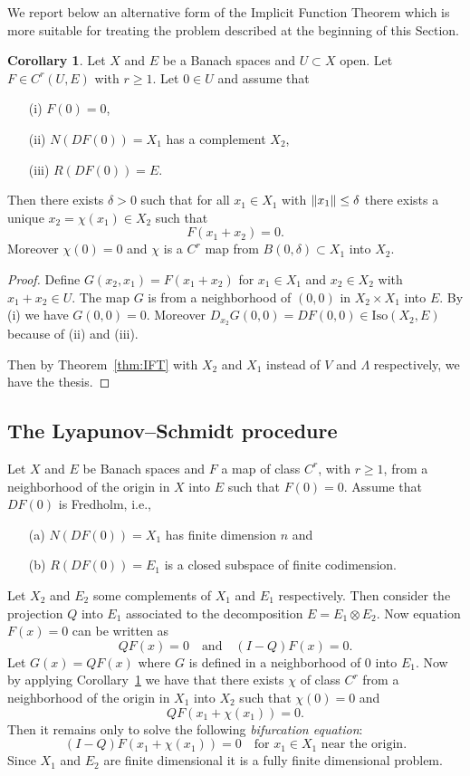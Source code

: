 \documentclass[a4paper,11pt]{article}
\theoremstyle{definition}
\newtheorem{cor}[prop]{Corollary}
\DeclarePairedDelimiter{\norm}{\lVert}{\rVert}
\begin{document}
We report below an alternative form of the Implicit Function Theorem which is more suitable for treating the problem described at the beginning of this Section.
\begin{cor}
\label{cor:alt-IFT}
Let $X$ and $E$ be a Banach spaces and $U\subset X$ open. Let $F\in C^r(U,E)$ with $r\ge1$. Let $0\in U$ and assume that
\begin{itemize}
\item[(i)] $F(0)=0$,
\item[(ii)] $N(DF(0))=X_1$ has a complement $X_2$,
\item[(iii)] $R(DF(0))=E$.
\end{itemize}
Then there exists $\delta>0$ such that for all $x_1\in X_1$ with $\norm{x_1}\le\delta$ there exists a unique $x_2=\chi(x_1)\in X_2$ such that
\[
F(x_1+x_2)=0.
\]
Moreover $\chi(0)=0$ and $\chi$ is a $C^r$ map from $B(0,\delta)\subset X_1$ into $X_2$.
\end{cor}
\begin{proof}
Define $G(x_2,x_1)=F(x_1+x_2)$ for $x_1\in X_1$ and $x_2\in X_2$ with $x_1+x_2\in U$. The map $G$ is from a neighborhood of $(0,0)$ in $X_2\times X_1$ into $E$. By (i) we have $G(0,0)=0$. Moreover $D_{x_2}G(0,0)=DF(0,0)\in\text{Iso}(X_2,E)$ because of (ii) and (iii).

Then by Theorem~\ref{thm:IFT} with $X_2$ and $X_1$ instead of $V$ and $\Lambda$ respectively, we have the thesis.
\end{proof}

\subsection{The Lyapunov--Schmidt procedure}

Let $X$ and $E$ be Banach spaces and $F$ a map of class $C^r$, with $r\ge1$, from a neighborhood of the origin in $X$ into $E$ such that $F(0)=0$. Assume that $DF(0)$ is Fredholm, i.e.,
\begin{itemize}
\item[(a)] $N(DF(0))=X_1$ has finite dimension $n$ and
\item[(b)] $R(DF(0))=E_1$ is a closed subspace of finite codimension.
\end{itemize}
Let $X_2$ and $E_2$ some complements of $X_1$ and $E_1$ respectively. Then consider the projection $Q$ into $E_1$ associated to the decomposition $E=E_1\otimes E_2$. Now equation $F(x)=0$ can be written as
\[
QF(x)=0\quad\text{and}\quad (I-Q)F(x)=0.
\]
Let $G(x)=QF(x)$ where $G$ is defined in a neighborhood of $0$ into $E_1$. Now by applying Corollary~\ref{cor:alt-IFT} we have that there exists $\chi$ of class $C^r$ from a neighborhood of the origin in $X_1$ into $X_2$ such that $\chi(0)=0$ and
\[
QF(x_1+\chi(x_1))=0.
\]
Then it remains only to solve the following \emph{bifurcation equation}:
\begin{equation}
\label{eqn:finite-dim}
(I-Q)F(x_1+\chi(x_1))=0\quad\text{for $x_1\in X_1$ near the origin}.
\end{equation}
Since $X_1$ and $E_2$ are finite dimensional it is a fully finite dimensional problem.
\end{document}
